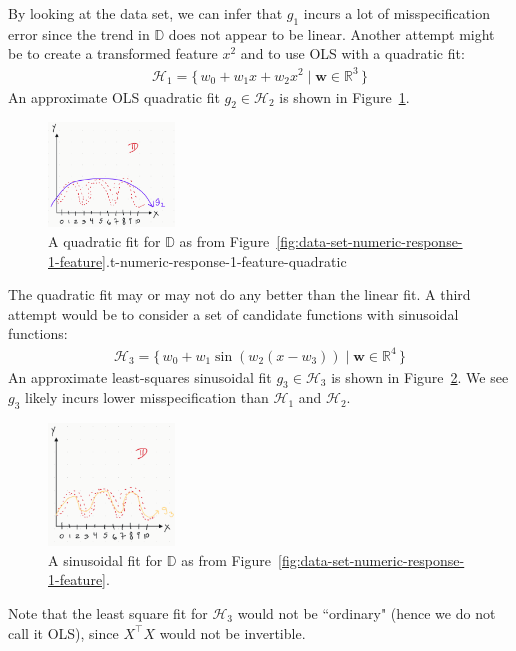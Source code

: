 \documentclass[12pt, a4paper]{article}
\theoremstyle{definition}
\begin{document}
	By looking at the data set, we can infer that $g_1$ incurs a lot of misspecification
	error since the trend in $\mathbb{D}$ does not appear to be linear.
	Another attempt might be to create a transformed feature $x^2$ and to
	use OLS with a quadratic fit:
	\begin{align*}
		\mathcal{H}_1 = \{\,
		w_0 + w_1 x + w_2 x^2 \mid \bm{w}\in \mathbb{R}^3
		\,\}
	\end{align*}
	An approximate OLS quadratic fit $g_2\in \mathcal{H}_2$ is shown in
	Figure~\ref{fig:data-set-numeric-response-1-feature-quadratic}.
	\begin{figure}
		\centering
		\includegraphics[width=0.3\textwidth]{data-set-numeric-response-1-feature-ols-quadratic}
		\caption{A quadratic fit for $\mathbb{D}$ as from Figure~\ref{fig:data-set-numeric-response-1-feature}.t-numeric-response-1-feature-quadratic}
		\label{fig:data-set-numeric-response-1-feature-quadratic}
	\end{figure}
	The quadratic fit may or may not do any better than the linear fit.
	A third attempt would be to consider a set of candidate functions with sinusoidal
	functions:
	\begin{align*}
		\mathcal{H}_3 = \{\,
		w_0 + w_1 \sin(w_2(x - w_3)) \mid \bm{w}\in \mathbb{R}^4
		\,\}
	\end{align*}
	An approximate least-squares sinusoidal fit $g_3\in \mathcal{H}_3$ is shown in
	Figure~\ref{fig:data-set-numeric-response-1-feature-sine}. We see $g_3$
	likely incurs lower misspecification than $\mathcal{H}_1$ and $\mathcal{H}_2$.
	\begin{figure}
		\centering
		\includegraphics[width=0.3\textwidth]{data-set-numeric-response-1-feature-ols-sine}
		\caption{A sinusoidal fit for $\mathbb{D}$ as from Figure~\ref{fig:data-set-numeric-response-1-feature}.}
		\label{fig:data-set-numeric-response-1-feature-sine}
	\end{figure}
	Note that the least square fit for $\mathcal{H}_3$ would not be ``ordinary"
	(hence we do not call it OLS), since $X^\top X$ would not be invertible.
	
\end{document}
